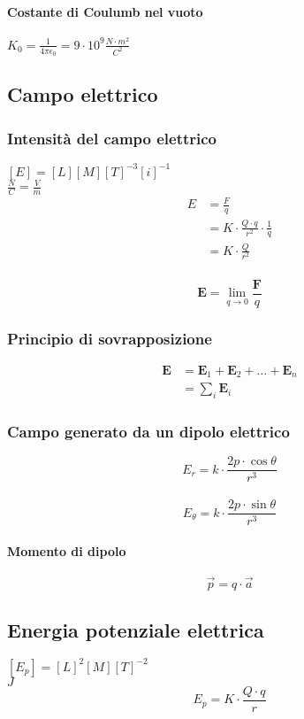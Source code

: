 \documentclass[a4paper,12pt]{article}
\theoremstyle{mystyle}
\begin{document}
\paragraph{Costante di Coulumb nel vuoto}
\(K_0 = \frac{1}{4 \pi \epsilon_0} = 9 \cdot 10^9 \frac{N \cdot m^2}{C^2}\)

\newpage


\subsection{Campo elettrico}
\subsubsection{Intensità del campo elettrico}
\([E]=[L][M][T]^{-3}[i]^{-1}\)\\
\(\frac{N}{C}=\frac{V}{m}\)\\

\[
\begin{aligned}
    E &= \frac{F}{q} \\
    &= K \cdot \frac{Q \cdot q}{r^2} \cdot \frac{1}{q}\\
    &= K \cdot \frac{Q}{r^2}
\end{aligned}\]\\
\[\textbf{E} = \lim_{q \rightarrow 0} \frac{\textbf{F}}{q}\]
\subsubsection{Principio di sovrapposizione}
\[
\begin{aligned}
    \textbf{E} &= \textbf{E}_1 + \textbf{E}_2 + \ldots + \textbf{E}_n \\
    &= \sum_i \textbf{E}_i
\end{aligned}\]
\subsubsection{Campo generato da un dipolo elettrico}
\[E_r = k \cdot \frac{2 p \cdot \cos \theta}{r^3}\]\\
\[E_\theta = k \cdot \frac{2p \cdot \sin \theta}{r^3}\]
\paragraph{Momento di dipolo}
\[\vec p = q \cdot \vec a\]

\newpage


\subsection{Energia potenziale elettrica}
\([E_p]=[L]^2[M][T]^{-2}\)\\
\(J\)\\
\[E_p = K \cdot \frac{Q \cdot q}{r}\]
\end{document}
